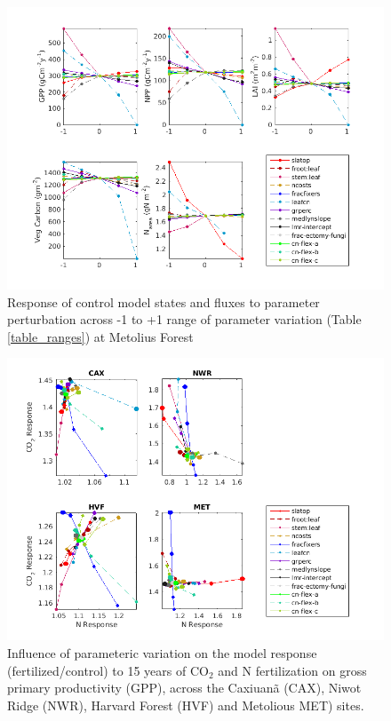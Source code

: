 \documentclass[draft,linenumbers]{agujournal}
\begin{document}
 \begin{figure}[h]
     \includegraphics[width=1.2\textwidth]{matlab/figures/NOVc_STATE_1CLM50defpft_trans_1x1pt_US-Me2_ens_MIC_y1_2012.png}
     \caption{Response of control model states and fluxes to parameter perturbation across -1 to +1 range of parameter variation (Table \ref{table_ranges}) at Metolius Forest}
     \label{MET state}
 \end{figure}

 
     
 \begin{figure}[h]
     \includegraphics[width=1.35\textwidth]{matlab/figures/NOVc_CNdep_GPP1__p2012.png}
     \caption{Influence of parameteric variation on the model response (fertilized/control) to 15 years of CO$_{2}$ and N fertilization on gross primary productivity (GPP), across the Caxiuan\~a (CAX), Niwot Ridge (NWR), Harvard Forest (HVF) and Metolious MET) sites. }
     \label{GPP CO2 and N respones 2001}
  \end{figure}
 
\end{document}
